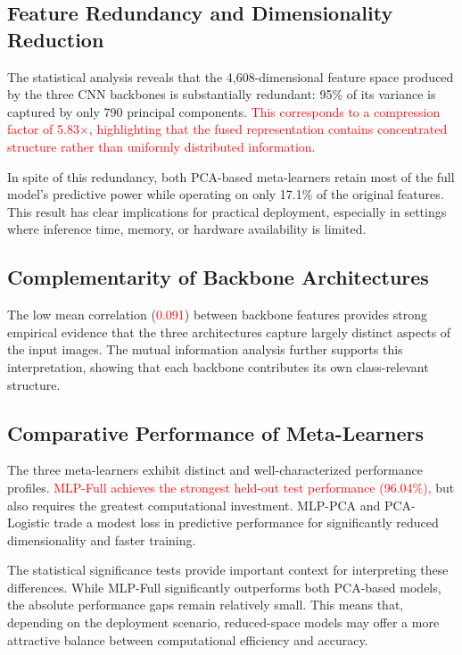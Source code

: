 \documentclass[pdflatex,sn-basic]{sn-jnl}
\begin{document}
\subsection{Feature Redundancy and Dimensionality Reduction}

The statistical analysis reveals that the 4,608-dimensional feature space produced by the three CNN backbones is substantially redundant: 95\% of its variance is captured by only 790 principal components. \textcolor{red}{This corresponds to a compression factor of 5.83$\times$, highlighting that the fused representation contains concentrated structure rather than uniformly distributed information.}

In spite of this redundancy, both PCA-based meta-learners retain most of the full model's predictive power while operating on only 17.1\% of the original features. This result has clear implications for practical deployment, especially in settings where inference time, memory, or hardware availability is limited.

\subsection{Complementarity of Backbone Architectures}

The low mean correlation (\textcolor{red}{0.091}) between backbone features provides strong empirical evidence that the three architectures capture largely distinct aspects of the input images. The mutual information analysis further supports this interpretation, showing that each backbone contributes its own class-relevant structure.

\subsection{Comparative Performance of Meta-Learners}

The three meta-learners exhibit distinct and well-characterized performance profiles. \textcolor{red}{MLP-Full achieves the strongest held-out test performance (96.04\%),} but also requires the greatest computational investment. MLP-PCA and PCA-Logistic trade a modest loss in predictive performance for significantly reduced dimensionality and faster training.

The statistical significance tests provide important context for interpreting these differences. While MLP-Full significantly outperforms both PCA-based models, the absolute performance gaps remain relatively small. This means that, depending on the deployment scenario, reduced-space models may offer a more attractive balance between computational efficiency and accuracy.
\end{document}
